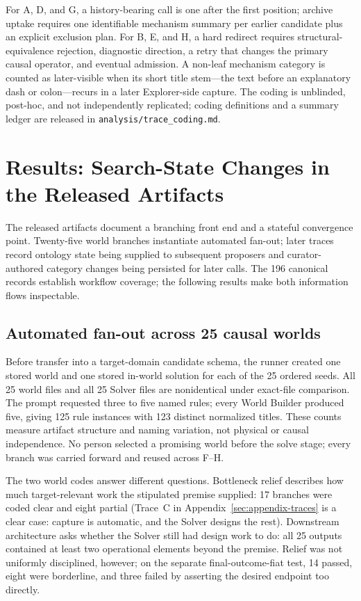 \documentclass[11pt,a4paper]{article}
\begin{document}
For A, D, and G, a history-bearing call is one after the first position; archive uptake requires one identifiable mechanism summary per earlier candidate plus an explicit exclusion plan. For B, E, and H, a hard redirect requires structural-equivalence rejection, diagnostic direction, a retry that changes the primary causal operator, and eventual admission. A non-leaf mechanism category is counted as later-visible when its short title stem---the text before an explanatory dash or colon---recurs in a later Explorer-side capture. The coding is unblinded, post-hoc, and not independently replicated; coding definitions and a summary ledger are released in \texttt{analysis/trace\_coding.md}.

\section{Results: Search-State Changes in the Released Artifacts}

The released artifacts document a branching front end and a stateful convergence point. Twenty-five world branches instantiate automated fan-out; later traces record ontology state being supplied to subsequent proposers and curator-authored category changes being persisted for later calls. The 196 canonical records establish workflow coverage; the following results make both information flows inspectable.

\subsection{Automated fan-out across 25 causal worlds}

Before transfer into a target-domain candidate schema, the runner created one stored world and one stored in-world solution for each of the 25 ordered seeds. All 25 world files and all 25 Solver files are nonidentical under exact-file comparison. The prompt requested three to five named rules; every World Builder produced five, giving 125 rule instances with 123 distinct normalized titles. These counts measure artifact structure and naming variation, not physical or causal independence. No person selected a promising world before the solve stage; every branch was carried forward and reused across F--H.

The two world codes answer different questions. Bottleneck relief describes how much target-relevant work the stipulated premise supplied: 17 branches were coded clear and eight partial (Trace~C in Appendix~\ref{sec:appendix-traces} is a clear case: capture is automatic, and the Solver designs the rest). Downstream architecture asks whether the Solver still had design work to do: all 25 outputs contained at least two operational elements beyond the premise. Relief was not uniformly disciplined, however; on the separate final-outcome-fiat test, 14 passed, eight were borderline, and three failed by asserting the desired endpoint too directly.
\end{document}
